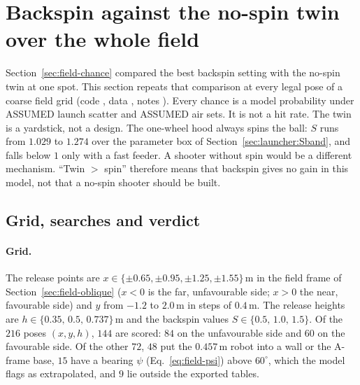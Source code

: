 \section{Backspin against the no-spin twin over the whole field}
\label{sec:svt}

Section~\ref{sec:field-chance} compared the best backspin setting with the no-spin twin at one spot. This
section repeats that comparison at every legal pose of a coarse field grid (code ,
data , notes ). Every chance is a model
probability\predicted{} under ASSUMED launch scatter and ASSUMED air sets. It is not a hit rate. The twin is
a yardstick, not a design. The one-wheel hood always spins the ball: $S$ runs from $1.029$\predicted{} to
$1.274$\predicted{} over the parameter box of Section~\ref{sec:launcher:Sband}, and falls below $1$ only with
a fast feeder. A shooter without spin would be a different mechanism. ``Twin $>$ spin'' therefore means that
backspin gives no gain in this model, not that a no-spin shooter should be built.

\subsection{Grid, searches and verdict}
\label{sec:svt-method}

\paragraph{Grid.} The release points are $x\in\{\pm0.65,\pm0.95,\pm1.25,\pm1.55\}$\,\unit{m}\assumed{} in the
field frame of Section~\ref{sec:field-oblique} ($x<0$ is the far, unfavourable side; $x>0$ the near,
favourable side) and $y$ from
$-1.2$\assumed{} to $2.0$\,\unit{m}\assumed{} in steps of $0.4$\,\unit{m}\assumed. The release heights are
$h\in\{0.35,\,0.5,\,0.737\}$\,\unit{m}\assumed{} and the backspin values $S\in\{0.5,\,1.0,\,1.5\}$\assumed.
Of the $216$\derived{} poses $(x,y,h)$, $144$\derived{} are scored: $84$\derived{} on the unfavourable side
and $60$\derived{} on the favourable side. Of the other $72$\derived, $48$\derived{} put the
$0.457$\,\unit{m}\confirmed{} robot into a wall or the A-frame base, $15$\derived{} have a bearing $\psi$
(Eq.~\eqref{eq:field-psi}) above $60^\circ$\assumed{}, which the model flags as extrapolated, and
$9$\derived{} lie outside the exported tables.

